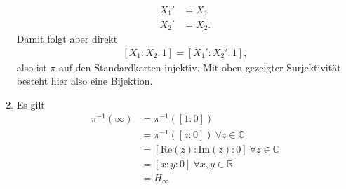 \documentclass[11pt]{article}
\begin{document}
\begin{enumerate}
\begin{equation*}
\begin{aligned}
	X_1' &= X_1\\
	X_2' &= X_2.
	\end{aligned}
	\end{equation*}
	Damit folgt aber direkt
	\begin{equation*}
	\begin{aligned}
	\left[X_1:X_2:1\right] = \left[X_1':X_2':1\right],
	\end{aligned}
	\end{equation*}
	also ist $ \pi $ auf den Standardkarten injektiv. Mit oben gezeigter Surjektivität besteht hier also eine Bijektion.
	\item Es gilt
	\begin{equation*}
	\begin{aligned}
	\pi^{-1}\left(\infty\right) &= \pi^{-1}\left(\left[1:0\right]\right)\\
	&=\pi^{-1}\left(\left[z:0\right]\right)\ \forall z \in \mathbb{C}\\
	&=\left[\mathrm{Re}(z):\mathrm{Im}(z):0\right]\ \forall z \in \mathbb{C}\\
	&=\left[x:y:0\right]\ \forall x,y \in \mathbb{R}\\
	&= H_\infty
	\end{aligned}
	\end{equation*}
\end{enumerate}
\end{document}
